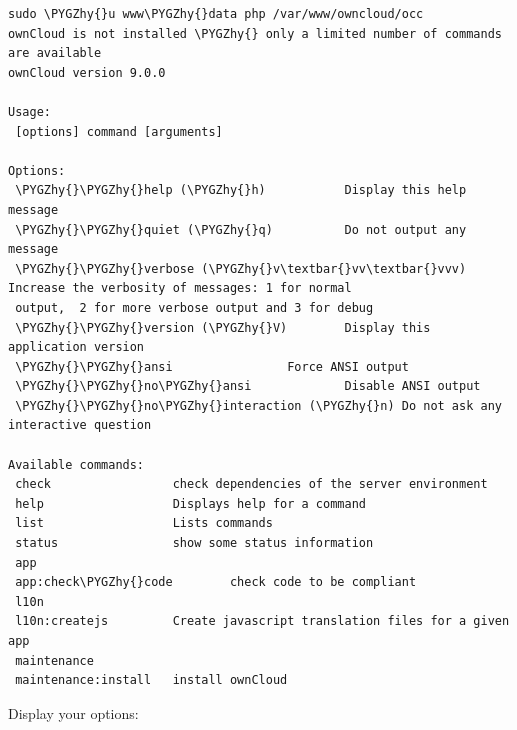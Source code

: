 \documentclass[letterpaper,10pt,english]{sphinxmanual}
\def\PYGZhy{\char`\-}
\begin{document}
\begin{Verbatim}[commandchars=\\\{\}]
sudo \PYGZhy{}u www\PYGZhy{}data php /var/www/owncloud/occ
ownCloud is not installed \PYGZhy{} only a limited number of commands are available
ownCloud version 9.0.0

Usage:
 [options] command [arguments]

Options:
 \PYGZhy{}\PYGZhy{}help (\PYGZhy{}h)           Display this help message
 \PYGZhy{}\PYGZhy{}quiet (\PYGZhy{}q)          Do not output any message
 \PYGZhy{}\PYGZhy{}verbose (\PYGZhy{}v\textbar{}vv\textbar{}vvv) Increase the verbosity of messages: 1 for normal
 output,  2 for more verbose output and 3 for debug
 \PYGZhy{}\PYGZhy{}version (\PYGZhy{}V)        Display this application version
 \PYGZhy{}\PYGZhy{}ansi                Force ANSI output
 \PYGZhy{}\PYGZhy{}no\PYGZhy{}ansi             Disable ANSI output
 \PYGZhy{}\PYGZhy{}no\PYGZhy{}interaction (\PYGZhy{}n) Do not ask any interactive question

Available commands:
 check                 check dependencies of the server environment
 help                  Displays help for a command
 list                  Lists commands
 status                show some status information
 app
 app:check\PYGZhy{}code        check code to be compliant
 l10n
 l10n:createjs         Create javascript translation files for a given app
 maintenance
 maintenance:install   install ownCloud
\end{Verbatim}

Display your  options:
\end{document}
